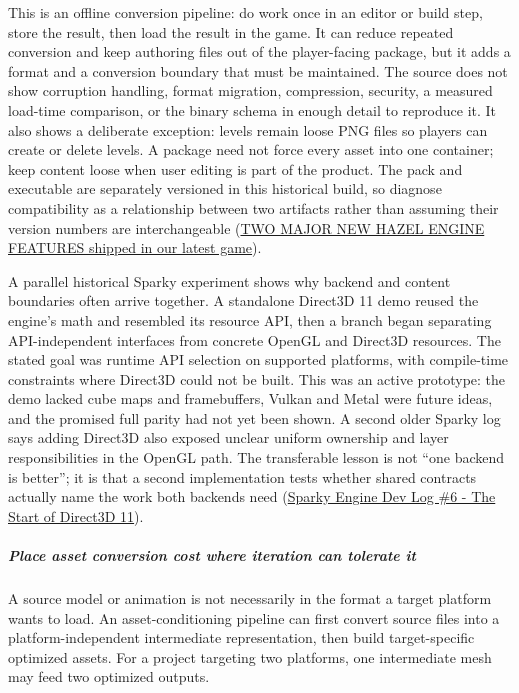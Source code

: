 This is an offline conversion pipeline: do work once in an editor or build step, store the result, then load the result in the game. It can reduce repeated conversion and keep authoring files out of the player-facing package, but it adds a format and a conversion boundary that must be maintained. The source does not show corruption handling, format migration, compression, security, a measured load-time comparison, or the binary schema in enough detail to reproduce it. It also shows a deliberate exception: levels remain loose PNG files so players can create or delete levels. A package need not force every asset into one container; keep content loose when user editing is part of the product. The pack and executable are separately versioned in this historical build, so diagnose compatibility as a relationship between two artifacts rather than assuming their version numbers are interchangeable (\href{https://www.youtube.com/watch?v=VjlKwQoKluI&t=7m59s}{TWO MAJOR NEW HAZEL ENGINE FEATURES shipped in our latest game}).

A parallel historical Sparky experiment shows why backend and content boundaries often arrive together. A standalone Direct3D 11 demo reused the engine's math and resembled its resource API, then a branch began separating API-independent interfaces from concrete OpenGL and Direct3D resources. The stated goal was runtime API selection on supported platforms, with compile-time constraints where Direct3D could not be built. This was an active prototype: the demo lacked cube maps and framebuffers, Vulkan and Metal were future ideas, and the promised full parity had not yet been shown. A second older Sparky log says adding Direct3D also exposed unclear uniform ownership and layer responsibilities in the OpenGL path. The transferable lesson is not ``one backend is better''; it is that a second implementation tests whether shared contracts actually name the work both backends need (\href{https://www.youtube.com/watch?v=AsNE-eGmGxs&t=2m47s}{Sparky Engine Dev Log \#6 - The Start of Direct3D 11}).

\subparagraph{Place asset conversion cost where iteration can tolerate it}\label{06-engine-ii-ch032-place-asset-conversion-cost-where-iteration-can-tolerate-it}

A source model or animation is not necessarily in the format a target platform wants to load. An asset-conditioning pipeline can first convert source files into a platform-independent intermediate representation, then build target-specific optimized assets. For a project targeting two platforms, one intermediate mesh may feed two optimized outputs.

